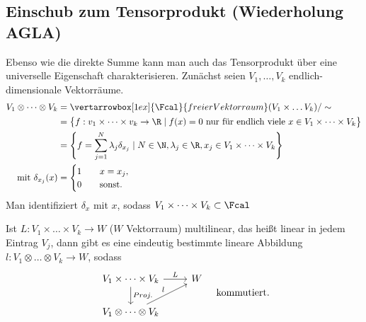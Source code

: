 \subsection*{Einschub zum Tensorprodukt (Wiederholung AGLA)}
	Ebenso wie die direkte Summe kann man auch das Tensorprodukt über eine universelle Eigenschaft charakterisieren. Zunächst seien $V_1,\dotsc,V_k$ endlich-dimensionale Vektorräume.
	\begin{align*}
		V_1 \otimes \dots \otimes V_k &= \vertarrowbox[1ex]{\Fcal}{freier Vektorraum} (V_1 \times \dots V_k)/\sim\\
		&= \big\{ f: v_1 \times \dots \times v_k \to \R \mid f(x) = 0\ \text{nur für endlich viele } x \in V_1 \times \dots \times V_k \big\}\\
		&= \Bigg\{ f = \sum_{j=1}^N \lambda_j \delta_{x_j} \mid N \in \N, \lambda_j \in \R, x_j \in V_1 \times \dots \times V_k \Bigg\}\\
		\text{mit }\delta_{x_j}(x) &= \begin{cases}
				1 \quad &x=x_j,\\0 \quad &\text{sonst.}
			\end{cases}
	\end{align*}
	Man identifiziert $\delta_x$ mit $x$, sodass $V_1 \times \dots \times V_k \subset \Fcal$
	\begin{prop*}
		Ist $ L: V_1 \times \dots \times V_k \to W $ ($W$ Vektorraum) multilinear, das heißt linear in jedem Eintrag $V_j$, dann gibt es eine eindeutig bestimmte lineare Abbildung $ l: V_1 \otimes \dots \otimes V_k \to W $, sodass
		\[ \begin{tikzcd}
			V_1 \times \dots \times V_k \arrow{r}{L} \arrow{d}{Proj.} & W\\
			V_1 \otimes \dots \otimes V_k \arrow{ur}{l}
		\end{tikzcd} \quad \text{kommutiert.} \]
	\end{prop*}